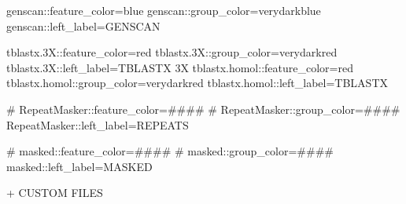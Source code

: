 \documentclass[11pt]{article}
\def\nwendcode{\endtrivlist \endgroup} %
\let\nwdocspar=\par                    %
\begin{document}
\nwenddocs{}\endmoddef
genscan::feature_color=blue
genscan::group_color=verydarkblue
genscan::left_label=GENSCAN
\nwendcode{}\nwdocspar

\nwenddocs{}\endmoddef
tblastx.3X::feature_color=red
tblastx.3X::group_color=verydarkred
tblastx.3X::left_label=TBLASTX 3X
tblastx.homol::feature_color=red
tblastx.homol::group_color=verydarkred
tblastx.homol::left_label=TBLASTX
\nwendcode{}\nwdocspar

\nwenddocs{}\endmoddef
# RepeatMasker::feature_color=####
# RepeatMasker::group_color=####
RepeatMasker::left_label=REPEATS
\nwendcode{}\nwdocspar

\nwenddocs{}\endmoddef
# masked::feature_color=####
# masked::group_color=####
masked::left_label=MASKED
\nwendcode{}\nwdocspar

+ CUSTOM FILES
\end{document}
